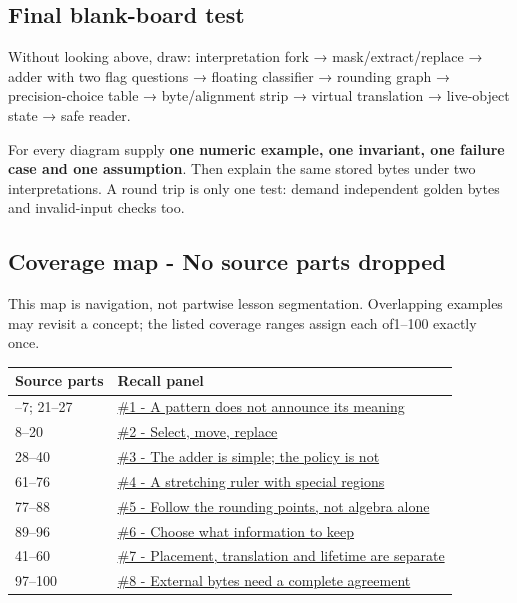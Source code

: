 \subsection{Final blank-board test}\label{appendix-ef4d27797a92-final-blank-board-test}

\hypertarget{appendix-ef4d27797a92-final-blank-board-test}{}

Without looking above, draw: interpretation fork → mask/extract/replace → adder with two flag questions → floating classifier → rounding graph → precision-choice table → byte/alignment strip → virtual translation → live-object state → safe reader.

For every diagram supply \textbf{one numeric example, one invariant, one failure case and one assumption}. Then explain the same stored bytes under two interpretations. A round trip is only one test: demand independent golden bytes and invalid-input checks too.

\subsection{Coverage map - No source parts dropped}\label{appendix-ef4d27797a92-coverage-map---no-source-parts-dropped}

\hypertarget{appendix-ef4d27797a92-coverage-map---no-source-parts-dropped}{}

This map is navigation, not partwise lesson segmentation. Overlapping examples may revisit a concept; the listed coverage ranges assign each of1--100 exactly once.

{\def\LTcaptype{none} %
\begin{longtable}[]{@{}ll@{}}
\toprule\noalign{}
Source parts & Recall panel \\
\midrule\noalign{}
\endhead
\bottomrule\noalign{}
\endlastfoot
1--7; 21--27 & \hyperref[appendix-ef4d27797a92-a-pattern-does-not-announce-its-meaning]{\#1 - A pattern does not announce its meaning} \\
8--20 & \hyperref[appendix-ef4d27797a92-select-move-replace]{\#2 - Select, move, replace} \\
28--40 & \hyperref[appendix-ef4d27797a92-the-adder-is-simple-the-policy-is-not]{\#3 - The adder is simple; the policy is not} \\
61--76 & \hyperref[appendix-ef4d27797a92-a-stretching-ruler-with-special-regions]{\#4 - A stretching ruler with special regions} \\
77--88 & \hyperref[appendix-ef4d27797a92-follow-the-rounding-points-not-algebra-alone]{\#5 - Follow the rounding points, not algebra alone} \\
89--96 & \hyperref[appendix-ef4d27797a92-choose-what-information-to-keep]{\#6 - Choose what information to keep} \\
41--60 & \hyperref[appendix-ef4d27797a92-placement-translation-and-lifetime-are-separate]{\#7 - Placement, translation and lifetime are separate} \\
97--100 & \hyperref[appendix-ef4d27797a92-external-bytes-need-a-complete-agreement]{\#8 - External bytes need a complete agreement} \\
\end{longtable}
}

